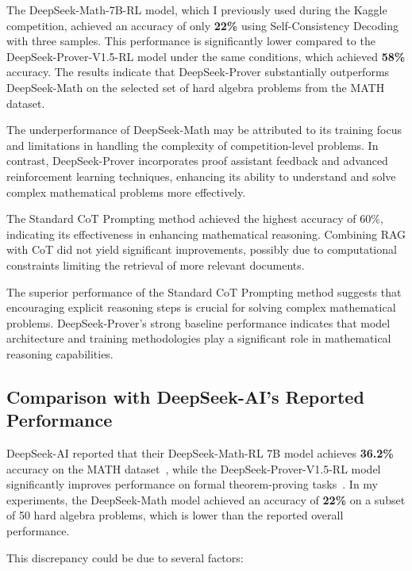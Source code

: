 \documentclass[11pt,a4paper]{article}
\begin{document}
The DeepSeek-Math-7B-RL model, which I previously used during the Kaggle competition, achieved an accuracy of only \textbf{22\%} using Self-Consistency Decoding with three samples. This performance is significantly lower compared to the DeepSeek-Prover-V1.5-RL model under the same conditions, which achieved \textbf{58\%} accuracy. The results indicate that DeepSeek-Prover substantially outperforms DeepSeek-Math on the selected set of hard algebra problems from the MATH dataset.

The underperformance of DeepSeek-Math may be attributed to its training focus and limitations in handling the complexity of competition-level problems. In contrast, DeepSeek-Prover incorporates proof assistant feedback and advanced reinforcement learning techniques, enhancing its ability to understand and solve complex mathematical problems more effectively.

The Standard CoT Prompting method achieved the highest accuracy of 60\%, indicating its effectiveness in enhancing mathematical reasoning. Combining RAG with CoT did not yield significant improvements, possibly due to computational constraints limiting the retrieval of more relevant documents.

The superior performance of the Standard CoT Prompting method suggests that encouraging explicit reasoning steps is crucial for solving complex mathematical problems. DeepSeek-Prover's strong baseline performance indicates that model architecture and training methodologies play a significant role in mathematical reasoning capabilities.

\subsection{Comparison with DeepSeek-AI's Reported Performance}

DeepSeek-AI reported that their DeepSeek-Math-RL 7B model achieves \textbf{36.2\%} accuracy on the MATH dataset~\cite{shao2024deepseekmathpushinglimitsmathematical}, while the DeepSeek-Prover-V1.5-RL model significantly improves performance on formal theorem-proving tasks~\cite{xin2024deepseekproverv15harnessingproofassistant}. In my experiments, the DeepSeek-Math model achieved an accuracy of \textbf{22\%} on a subset of 50 hard algebra problems, which is lower than the reported overall performance.

This discrepancy could be due to several factors:
\end{document}
